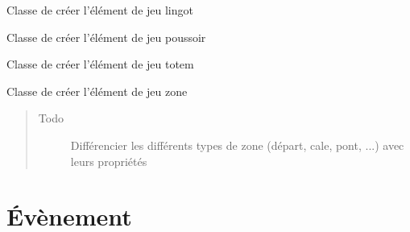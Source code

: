 \documentclass[letterpaper,10pt,french]{sphinxmanual}
\begin{document}

\begin{fulllineitems}
\label{elements_jeu:lib.elements_jeu.Lingot}
Classe de créer l'élément de jeu lingot

\end{fulllineitems}


\begin{fulllineitems}
\label{elements_jeu:lib.elements_jeu.Poussoir}
Classe de créer l'élément de jeu poussoir

\end{fulllineitems}


\begin{fulllineitems}
\label{elements_jeu:lib.elements_jeu.Totem}
Classe de créer l'élément de jeu totem

\end{fulllineitems}


\begin{fulllineitems}
\label{elements_jeu:lib.elements_jeu.Zone}
Classe de créer l'élément de jeu zone
\begin{quote}\begin{description}
\item[{Todo }] \leavevmode
Différencier les différents types de zone (départ, cale, pont, ...) avec leurs propriétés

\end{description}\end{quote}

\end{fulllineitems}



\chapter{Évènement}
\label{evenement:evenement}\label{evenement:module-lib.evenement}\label{evenement::doc}
\end{document}
